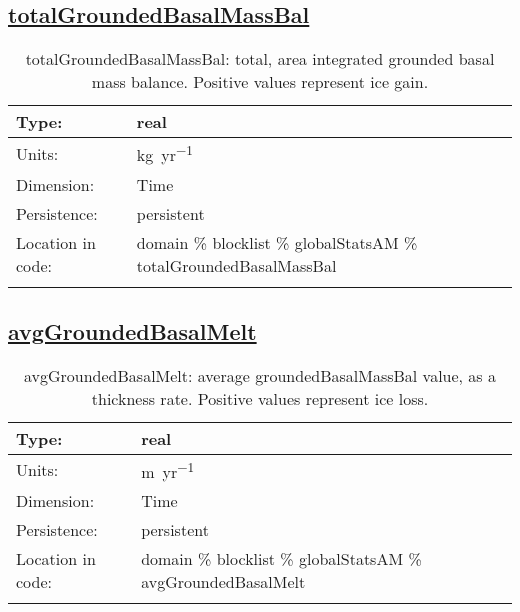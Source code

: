 \subsection[totalGroundedBasalMassBal]{\hyperref[sec:var_tab_globalStatsAM]{totalGroundedBasalMassBal}}
\label{subsec:var_sec_globalStatsAM_totalGroundedBasalMassBal}
\begin{center}
\begin{longtable}{| p{2.0in} | p{4.0in} |}
        \hline 
        Type: & real \\
        \hline 
        Units: & \si{kg.yr^{-1}} \\
        \hline 
        Dimension: & Time \\
        \hline 
        Persistence: & persistent \\
        \hline 
         Location in code: & domain \% blocklist \% globalStatsAM \% totalGroundedBasalMassBal \\
         \hline 
    \caption{totalGroundedBasalMassBal: total, area integrated grounded basal mass balance. Positive values represent ice gain.}
\end{longtable}
\end{center}
\subsection[avgGroundedBasalMelt]{\hyperref[sec:var_tab_globalStatsAM]{avgGroundedBasalMelt}}
\label{subsec:var_sec_globalStatsAM_avgGroundedBasalMelt}
\begin{center}
\begin{longtable}{| p{2.0in} | p{4.0in} |}
        \hline 
        Type: & real \\
        \hline 
        Units: & \si{m.yr^{-1}} \\
        \hline 
        Dimension: & Time \\
        \hline 
        Persistence: & persistent \\
        \hline 
         Location in code: & domain \% blocklist \% globalStatsAM \% avgGroundedBasalMelt \\
         \hline 
    \caption{avgGroundedBasalMelt: average groundedBasalMassBal value, as a thickness rate. Positive values represent ice loss.}
\end{longtable}
\end{center}
